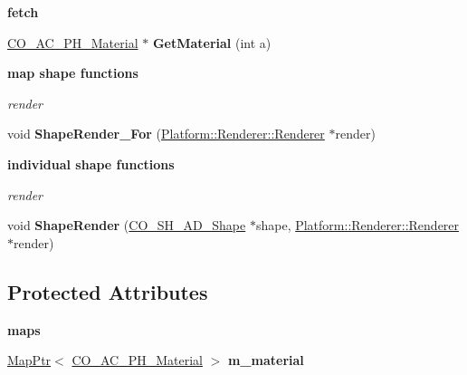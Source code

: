 \begin{Indent}{\bf fetch}\par
{\em \label{_amgrp5374034a40c8d6800cb4f449c2ea00a0}
 }\begin{DoxyCompactItemize}
\item 
\hypertarget{classContent_1_1Actor_1_1Physics_1_1RigidActor_aa5c66f724d7a8b04947fa84ab9f5c3a5}{
\hyperlink{classContent_1_1Actor_1_1Physics_1_1Material}{CO\_\-AC\_\-PH\_\-Material} $\ast$ {\bfseries GetMaterial} (int a)}
\label{classContent_1_1Actor_1_1Physics_1_1RigidActor_aa5c66f724d7a8b04947fa84ab9f5c3a5}

\end{DoxyCompactItemize}
\end{Indent}
\begin{Indent}{\bf map shape functions}\par
{\em \label{_amgrp58877cbd9b74ecd74bdc9f7faae78ddf}
 render }\begin{DoxyCompactItemize}
\item 
\hypertarget{classContent_1_1Actor_1_1Physics_1_1RigidActor_ade7503cbeea6cfc99dcc9cc8b89f5c64}{
void {\bfseries ShapeRender\_\-For} (\hyperlink{classPlatform_1_1Renderer_1_1Renderer}{Platform::Renderer::Renderer} $\ast$render)}
\label{classContent_1_1Actor_1_1Physics_1_1RigidActor_ade7503cbeea6cfc99dcc9cc8b89f5c64}

\end{DoxyCompactItemize}
\end{Indent}
\begin{Indent}{\bf individual shape functions}\par
{\em \label{_amgrpbe60aab0682f4b9b26e81c6c7416b7c2}
 render }\begin{DoxyCompactItemize}
\item 
\hypertarget{classContent_1_1Actor_1_1Physics_1_1RigidActor_a5579d5b3e6d71c89a08999d790ad39c6}{
void {\bfseries ShapeRender} (\hyperlink{classContent_1_1Shape_1_1Admin_1_1Shape}{CO\_\-SH\_\-AD\_\-Shape} $\ast$shape, \hyperlink{classPlatform_1_1Renderer_1_1Renderer}{Platform::Renderer::Renderer} $\ast$render)}
\label{classContent_1_1Actor_1_1Physics_1_1RigidActor_a5579d5b3e6d71c89a08999d790ad39c6}

\end{DoxyCompactItemize}
\end{Indent}
\subsection*{Protected Attributes}
\begin{Indent}{\bf maps}\par
{\em \label{_amgrp7e94476d62556cc8501e3df5b8d6470d}
 }\begin{DoxyCompactItemize}
\item 
\hypertarget{classContent_1_1Actor_1_1Physics_1_1RigidActor_a349cc06faa6e77c6ca3959a96192a5d0}{
\hyperlink{classMapPtr}{MapPtr}$<$ \hyperlink{classContent_1_1Actor_1_1Physics_1_1Material}{CO\_\-AC\_\-PH\_\-Material} $>$ {\bfseries m\_\-material}}
\label{classContent_1_1Actor_1_1Physics_1_1RigidActor_a349cc06faa6e77c6ca3959a96192a5d0}

\end{DoxyCompactItemize}
\end{Indent}


